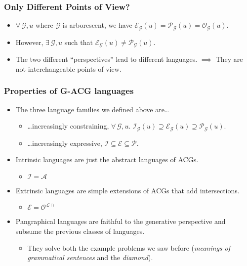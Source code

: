 \documentclass{beamer}
\begin{document}
\begin{frame}
  \frametitle{Only Different Points of View?}

  \begin{itemize}
  \item $\forall \, \mathcal{G}, u$ where $\mathcal{G}$ is arborescent,
    we have $\mathcal{E}_{\mathcal{G}}(u) = \mathcal{P}_{\mathcal{G}}(u)
    = \mathcal{O}_{\mathcal{G}}(u)$.
  \item However, $\exists \, \mathcal{G}, u$ such that
    $\mathcal{E}_{\mathcal{G}}(u) \neq \mathcal{P}_{\mathcal{G}}(u)$.
  \item The two different ``perspectives'' lead to different languages.
    $\implies$ They are not interchangeable points of view.
  \end{itemize}
\end{frame}


\begin{frame}
  \frametitle{Properties of G-ACG languages}

  \begin{itemize}
  \item The three language families we defined above are\ldots
    \begin{itemize}
    \item {\ldots}increasingly constraining, $\forall \, \mathcal{G},
      u. \; \mathcal{I}_{\mathcal{G}}(u) \supseteq
      \mathcal{E}_{\mathcal{G}}(u) \supseteq
      \mathcal{P}_{\mathcal{G}}(u)$.
    \item {\ldots}increasingly expressive, $\mathcal{I} \subseteq
      \mathcal{E} \subseteq \mathcal{P}$.
    \end{itemize}
  \item Intrinsic languages are just the abstract languages of ACGs.
    \begin{itemize}
    \item $\mathcal{I} = \mathcal{A}$
    \end{itemize}
  \item Extrinsic languages are simple extensions of ACGs that add
    intersections.
    \begin{itemize}
    \item $\mathcal{E} = \mathcal{O}^{\mathcal{L}{\cap}}$
    \end{itemize}
  \item Pangraphical languages are faithful to the generative
    perspective and subsume the previous classes of languages.
    \begin{itemize}
    \item They solve both the example problems we saw before
      (\emph{meanings of grammatical sentences} and the \emph{diamond}).
    \end{itemize}
  \end{itemize}
\end{frame}
\end{document}
